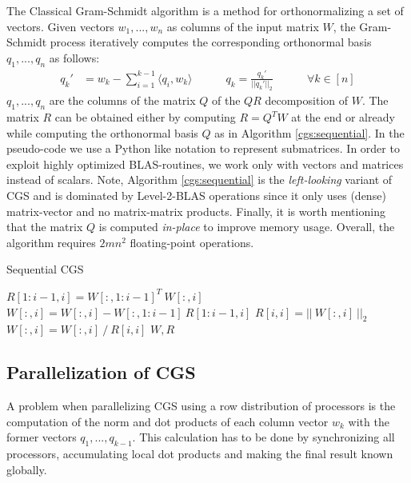 \documentclass{article}
\begin{document}
The Classical Gram-Schmidt algorithm is a method for orthonormalizing a set of
vectors. Given vectors $w_1, ..., w_n$ as columns of the input matrix $W$, the
Gram-Schmidt process iteratively computes the corresponding orthonormal basis
$q_1, ..., q_n$ as follows:
\begin{align}
        q_k' &= w_k - \sum_{i = 1}^{k-1} \langle q_i , w_k \rangle
        \quad \quad \quad q_k = \frac{q_k'}{||q_k'||_2}
        \quad \quad \quad \forall k \in [n]
\end{align}
$q_1, ..., q_n$ are the columns of the matrix $Q$ of the $QR$ decomposition of
$W$. The matrix $R$ can be obtained either by computing $R = Q^T W$ at the end
or already while computing the orthonormal basis $Q$ as in Algorithm
\ref{cgs:sequential}. In the pseudo-code we use a Python like notation to
represent submatrices. In order to exploit highly optimized BLAS-routines, we
work only with vectors and matrices instead of scalars. Note, Algorithm
\ref{cgs:sequential} is the \textit{left-looking} variant of CGS and is
dominated by Level-2-BLAS operations since it only uses (dense) matrix-vector
and no matrix-matrix products. Finally, it is worth mentioning that the matrix
$Q$ is computed \textit{in-place} to improve memory usage. Overall, the
algorithm requires $2mn^2$ floating-point operations.

\begin{algorithm}[t]
    \caption{Sequential CGS} \label{cgs:sequential}
    \begin{algorithmic}[1]
                \State $R[1:i-1,i] = W[:, 1:i-1]^T \ W[:, i]$
                \State $W[:, i] = W[:, i] - W[:, 1:i-1] \ R[1:i-1,i]$
            \EndIf
            \State $R[i,i] = || \ W[:,i] \ ||_2$
            \State $W[:,i] = W[:,i] \ / \ R[i,i]$
        \EndFor
        \State \Return $W, R$
    \end{algorithmic}
\end{algorithm}

\subsection{Parallelization of CGS}

A problem when parallelizing CGS using a row distribution of processors is the
computation of the norm and dot products of each column vector $w_k$ with the
former vectors $q_1, ..., q_{k-1}$. This calculation has to be done by
synchronizing all processors, accumulating local dot products and making the
final result known globally.
\end{document}
